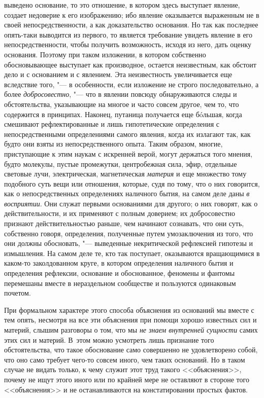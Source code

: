 выведено основание, то это отношение, в котором здесь выступает явление,
создает недоверие к его изображению; ибо явление оказывается выраженным не
в своей непосредственности, а как доказательство основания. Но так как
последнее опять-таки выводится из первого, то является требование увидеть
явление в его непосредственности, чтобы получить возможность, исходя из
него, дать оценку основания. Поэтому при таком изложении, в котором
собственно обосновывающее выступает как производное, остается неизвестным,
как обстоит дело и с основанием и с явлением. Эта неизвестность
увеличивается еще вследствие того, "--- в особенности, если изложение не
строго последовательно, а более {\em добросовестно}, "---
что в явлении повсюду обнаруживаются следы и обстоятельства, указывающие на
многое и часто совсем другое, чем то, что содержится в принципах. Наконец,
путаница получается еще бóльшая, когда смешивают рефлектированные и лишь
гипотетические определения с непосредственными определениями самого
явления, когда их излагают так, как будто они взяты из непосредственного
опыта. Таким образом, многие, приступающие к этим наукам с искренней верой,
могут держаться того мнения, будто молекулы, пустые промежутки,
центробежная сила, эфир, отдельные световые лучи, электрическая,
магнетическая {\em материя} и еще множество тому
подобного суть вещи или отношения, которые, судя по тому, что о них
говорится, как о непосредственных определениях наличного бытия, на самом
деле даны {\em в восприятии}. Они служат первыми
основаниями для другого; о них говорят, как о действительности, и их
применяют с полным доверием; их добросовестно признают действительностью
раньше, чем начинают сознавать, что они суть, собственно говоря,
определения, полученные путем умозаключения из того, что они должны
обосновать, "--- выведенные некритической рефлексией гипотезы и измышления. На
самом деле те, кто так поступает, оказываются вращающимися в каком-то
заколдованном круге, в котором определения наличного бытия и определения
рефлексии, основание и обоснованное, феномены и фантомы перемешаны вместе в
нераздельном сообществе и пользуются одинаковым почетом.

При формальном характере этого способа объяснения из оснований мы вместе с
тем опять, несмотря на все эти объяснения при помощи хорошо известных сил и
материй, слышим разговоры о том, что мы {\em не знаем
внутренней сущности} самих этих сил и материй. В~этом можно усмотреть лишь
признание того обстоятельства, что такое обоснование само совершенно не
удовлетворено собой, что оно само требует чего-то совсем иного, чем таких
оснований. Но в таком случае не видать только, к чему служит этот труд
такого <<объяснения>>, почему не ищут этого иного или по крайней мере не
оставляют в стороне того <<объяснения>> и не останавливаются на
констатировании простых фактов.

